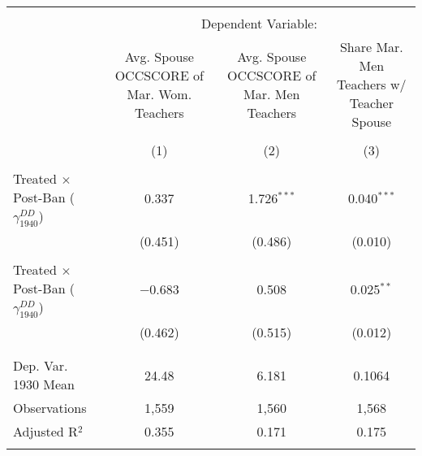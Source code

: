 
\begin{tabular}{@{\extracolsep{5pt}}lccc} 
\\[-1.8ex]\hline 
\hline \\[-1.8ex] 
 & \multicolumn{3}{c}{Dependent Variable:} \\ 
\cline{2-4} 
 & Avg. Spouse OCCSCORE of Mar. Wom. Teachers & Avg. Spouse OCCSCORE of Mar. Men Teachers & Share Mar. Men Teachers w/ Teacher Spouse \\ 
\\[-1.8ex] & (1) & (2) & (3)\\ 
\hline \\[-1.8ex] 
 Treated $\times$ Post-Ban ($\gamma_{1940}^{DD}$) & 0.337 & 1.726$^{***}$ & 0.040$^{***}$ \\ 
  & (0.451) & (0.486) & (0.010) \\ 
  & & & \\ 
 Treated $\times$ Post-Ban ($\gamma_{1940}^{DD}$) & $-$0.683 & 0.508 & 0.025$^{**}$ \\ 
  & (0.462) & (0.515) & (0.012) \\ 
  & & & \\ 
\hline \\[-1.8ex] 
Dep. Var. 1930 Mean & 24.48 & 6.181 & 0.1064 \\ 
Observations & 1,559 & 1,560 & 1,568 \\ 
Adjusted R$^{2}$ & 0.355 & 0.171 & 0.175 \\ 
\hline 
\hline \\[-1.8ex] 
\end{tabular} 
